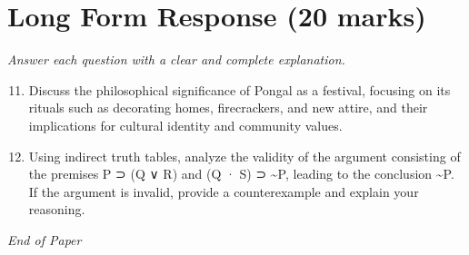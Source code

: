\documentclass[12pt]{article}
\begin{document}
\section*{Long Form Response (20 marks)}
\textit{Answer each question with a clear and complete explanation.}
\begin{enumerate}[label=\arabic*.]
\setcounter{enumi}{10}
\item Discuss the philosophical significance of Pongal as a festival, focusing on its rituals
such as decorating homes, firecrackers, and new attire, and their implications for
cultural identity and community values.
\item Using indirect truth tables, analyze the validity of the argument consisting of the
premises P ⊃ (Q ∨ R) and (Q · S) ⊃ \textasciitilde{}P, leading to the conclusion \textasciitilde{}P. If the argument is
invalid, provide a counterexample and explain your reasoning.
\end{enumerate}

\vfill
\noindent\textit{End of Paper}
\end{document}
